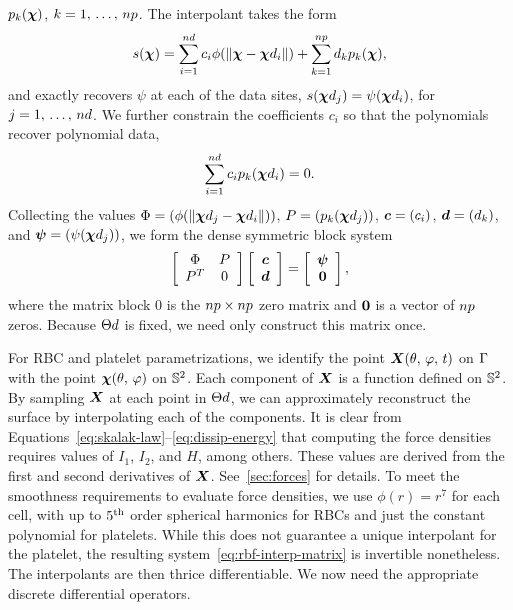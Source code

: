 $p_k(\boldsymbol{\chi})$, $k=1,\,\ldots,\,\poly\cardinality$. The interpolant takes the form
\begin{equation}\label{eq:rbf-interp}
    s(\Xp)
    = \sum_{i=1}^{\data\cardinality} c_i \phi(\|\Xp-\data\Xp_i\|)
    + \sum_{k=1}^{\poly\cardinality} d_k p_k(\Xp),
\end{equation}
and exactly recovers $\psi$ at each of the data sites,
$s(\data\Xp_j) = \psi(\data\Xp_i)$, for $j = 1,\,\ldots,\,\data\cardinality$. We further
constrain the coefficients $c_i$ so that the polynomials recover polynomial data,
\begin{equation}
    \sum_{i=1}^{\data\cardinality} c_i p_k(\data\Xp_i) = 0.
    \label{eq:constraints}
\end{equation}
Collecting the values $\Phi=(\phi(\|\data\Xp_j-\data\Xp_i\|))$, $P=(p_k(\data\Xp_j))$,
$\boldsymbol{c} = (c_i)$, $\boldsymbol{d} = (d_k)$, and $\cvec{\psi} = (\psi(\data\Xp_j))$, we form
the dense symmetric block system
\begin{equation}\label{eq:rbf-interp-matrix}
    \left[\begin{array}{cc}
            \Phi & P \\ P^T & 0
    \end{array}\right]\left[\begin{array}{c}
            \boldsymbol{c} \\ \boldsymbol{d}
    \end{array}\right] = \left[\begin{array}{c}
            \boldsymbol{\psi} \\ \boldsymbol{0}
    \end{array}\right],
\end{equation}
where the matrix block $0$ is the $\poly\cardinality\times\poly\cardinality$ zero matrix
and $\boldsymbol{0}$ is a vector of $\poly\cardinality$ zeros. Because $\data\sites$ is fixed,
we need only construct this matrix once.

For RBC and platelet parametrizations, we identify the point $\boldsymbol{X}(\theta,\,\varphi,\,t)$
on $\Gamma$ with the point $\boldsymbol{\chi}(\theta,\,\varphi)$ on $\mathbb{S}^2$. Each component of
$\boldsymbol{X}$ is a function defined on $\mathbb{S}^2$. By sampling $\boldsymbol{X}$ at each point in $\data\sites$,
we can approximately reconstruct the surface by interpolating each of the components. It
is clear from Equations~\eqref{eq:skalak-law}--\eqref{eq:dissip-energy} that computing
the force densities requires values of $I_1$, $I_2$, and $H$, among others. These values
are derived from the first and second derivatives of $\boldsymbol{X}$. See~\ref{sec:forces} for
details. To meet the smoothness requirements to evaluate force densities, we use
$\phi(r) = r^7$ for each cell, with up to $5\textsuperscript{th}$ order spherical harmonics for RBCs and
just the constant polynomial for platelets. While this does not guarantee a unique
interpolant for the platelet, the resulting system~\eqref{eq:rbf-interp-matrix} is
invertible nonetheless. The interpolants are then thrice differentiable. We now need the
appropriate discrete differential operators.

